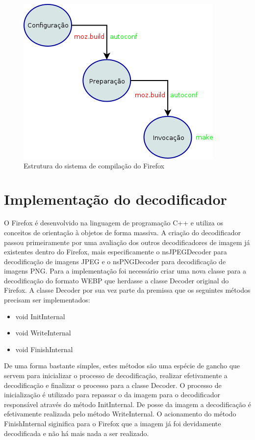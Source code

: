 \documentclass[espaco=simples,appendix=Name]{abnt}
\begin{document}
\begin{figure}[h]
  \centering
    \includegraphics[scale=0.45]{BuildSystem.png}
  \caption{Estrutura do sistema de compilação do Firefox}
\end{figure}

\section{Implementação do decodificador}

O Firefox é desenvolvido na linguagem de programação C++ e utiliza os conceitos de orientação à objetos de forma massiva. A criação do decodificador passou primeiramente por uma avaliação dos outros decodificadores de imagem já existentes dentro do Firefox, mais especificamente o nsJPEGDecoder para decodificação de imagens JPEG e o nsPNGDecoder para decodificação de imagens PNG. Para a implementação foi necessário criar uma nova classe para a decodificação do formato WEBP que herdasse a classe Decoder original do Firefox. A classe Decoder por sua vez parte da premissa que os seguintes métodos precisam ser implementados:

\begin{itemize}
        \item void InitInternal
        \item void WriteInternal
        \item void FinishInternal
\end{itemize}

De uma forma bastante simples, estes métodos são uma espécie de gancho que servem para inicializar o processo de decodificação, realizar efetivamente a decodificação e finalizar o processo para a classe Decoder. O processo de inicialização é utilizado para repassar o  da imagem para o decodificador responsável através do método InitInternal. De posse da imagem a decodificação é efetivamente realizada pelo método WriteInternal. O acionamento do método FinishInternal siginifica para o Firefox que a imagem já foi devidamente decodificada e não há mais nada a ser realizado.
\end{document}

